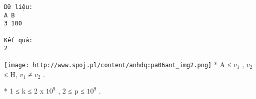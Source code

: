 \begin{verbatim}
Dữ liệu:
A B
3 100

Kết quả:
2
\end{verbatim}


\texttt{[image: http://www.spoj.pl/content/anhdq:pa06ant\_img2.png]}
* A ≤ $v_{1}$   , $v_{2}$   ≤ H, $v_{1}$   ≠ $v_{2}$   .   


   * 1 ≤ k ≤ 2 x $10^{9}$   , 2 ≤ p ≤ $10^{9}$   .